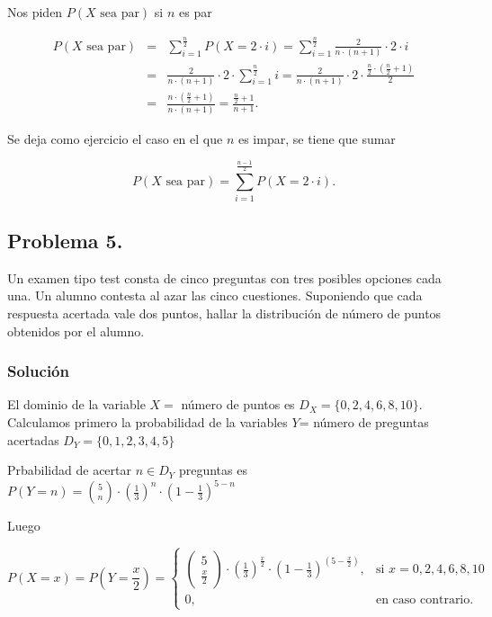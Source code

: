 \documentclass[
]{article}
\begin{document}
Nos piden \(P(X\mbox{ sea par})\) si \(n\) es par

\begin{eqnarray*}
P(X\mbox{ sea par})&=&\sum_{i=1}^{\frac{n}{2}} P(X=2\cdot i)=
\sum_{i=1}^{\frac{n}{2}}  \frac{2}{n\cdot (n+1)}\cdot 2\cdot i\\
&=& \frac{2}{n\cdot (n+1)}\cdot2 \cdot  \sum_{i=1}^{\frac{n}{2}} i=
\frac{2}{n\cdot (n+1)}\cdot2 \cdot  \frac{\frac{n}{2}\cdot (\frac{n}{2}+1)}{2}\\
&=& \frac{n\cdot (\frac{n}{2}+1)}{n\cdot(n+1)}=
\frac{\frac{n}{2}+1}{n+1}.
\end{eqnarray*}

Se deja como ejercicio el caso en el que \(n\) es impar, se tiene que
sumar

\[
P(X\mbox{ sea par})=\sum_{i=1}^{\frac{n-1}{2}} P(X=2\cdot i).
\]

\hypertarget{problema-5.}{%
\subsection{Problema 5.}\label{problema-5.}}

Un examen tipo test consta de cinco preguntas con tres posibles opciones
cada una. Un alumno contesta al azar las cinco cuestiones. Suponiendo
que cada respuesta acertada vale dos puntos, hallar la distribución de
número de puntos obtenidos por el alumno.

\hypertarget{soluciuxf3n-4}{%
\subsubsection{Solución}\label{soluciuxf3n-4}}

El dominio de la variable \(X=\) número de puntos es
\(D_X=\{0,2,4,6,8,10\}\). Calculamos primero la probabilidad de la
variables \(Y\)= número de preguntas acertadas \(D_Y=\{0,1,2,3,4,5\}\)

Prbabilidad de acertar \(n\in D_Y\) preguntas es
\(P(Y=n)={5 \choose n}\cdot \left(\frac13\right)^n\cdot \left(1-\frac13\right)^{5-n}\)

Luego

\[
P(X=x)=P\left(Y=\frac{x}{2}\right)=\begin{cases}
\left(\begin{array}{c}5\\\frac{x}{2}\end{array}\right)\cdot \left(\frac13\right)^\frac{x}{2}\cdot \left(1-\frac13\right)^{\left(5-\frac{x}{2}\right)}, & \mbox{si }x=0,2,4,6,8,10 \\
0, & \mbox{en caso contrario.}
\end{cases}
\]
\end{document}
